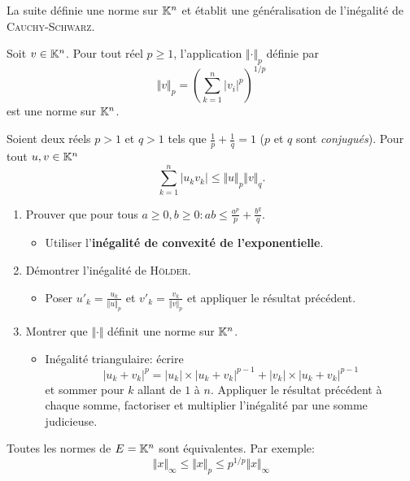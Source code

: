 La suite définie une norme sur $\mathbb{K}^n$ et établit une généralisation de l'inégalité de \textsc{Cauchy}-\textsc{Schwarz}. 
\begin{defi}
    Soit $v \in \mathbb{K}^n$. Pour tout réel $p \geqslant 1$, l'application $\Vert \bm{\cdot} \Vert_p$ définie par
    $$\Vert v \Vert_p = \left (\sum_{k=1}^{n} |v_i|^p \right)^{1/p}$$
    est une norme sur $\mathbb{K}^n$.
\end{defi}

\begin{prop}
    Soient deux réels $p > 1$ et $q > 1$ tels que $\frac{1}{p} + \frac{1}{q} = 1$ ($p$ et $q$ sont \emph{conjugués}). Pour tout $u, v \in \mathbb{K}^n$
    $$\sum_{k=1}^{n} |u_k v_k| \leqslant \Vert u \Vert_p \Vert v \Vert_q.$$
\end{prop}

\begin{preuve}
    \begin{enumerate}
        \item Prouver que pour tous $a \geqslant 0, b \geqslant 0: ab \leqslant \frac{a^p}{p} + \frac{b^q}{q}$.
        \begin{itemize}
            \item Utiliser l'\textbf{inégalité de convexité de l'exponentielle}.
        \end{itemize}
        \item Démontrer l'inégalité de \textsc{Hölder}.
        \begin{itemize}
            \item Poser $u'_k = \frac{u_k}{\Vert u \Vert_p}$ et $v'_k = \frac{v_k}{\Vert v \Vert_p}$ et appliquer le résultat précédent. 
        \end{itemize}
        \item Montrer que $\Vert \bm{\cdot} \Vert$ définit une norme sur $\mathbb{K}^n$.
        \begin{itemize}
            \item Inégalité triangulaire: écrire 
            $$|u_k + v_k|^p = |u_k| \times |u_k + v_k|^{p-1} + |v_k| \times |u_k + v_k|^{p-1}$$ 
            et sommer pour $k$ allant de $1$ à $n$. Appliquer le résultat précédent à chaque somme, factoriser et multiplier l'inégalité par une somme judicieuse. 
        \end{itemize}
    \end{enumerate}
\end{preuve}     

\begin{prop}
    Toutes les normes de $E = \mathbb{K}^n$ sont équivalentes. Par exemple:
    $$\Vert x \Vert_\infty \leqslant \Vert x \Vert_p \leqslant p^{1/p} \Vert x \Vert_\infty$$
\end{prop}
